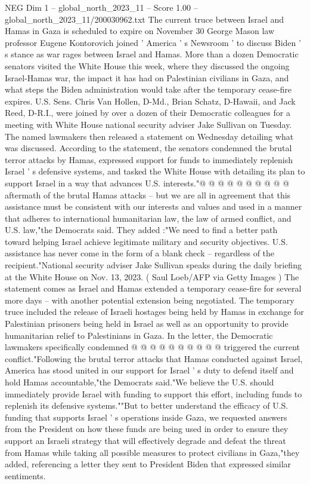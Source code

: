 \begin{textsample}{NEG Dim 1 – global\_north\_2023\_11 – Score 1.00 – global\_north\_2023\_11/200030962.txt}  \label{ex:f1_neg_098}
The current truce between Israel and Hamas in Gaza is scheduled to expire on November 30 George Mason law professor Eugene Kontorovich joined ' America ' s Newsroom ' to discuss Biden ' s stance as war rages between Israel and Hamas.
More than a dozen Democratic senators visited the White House this week, where they discussed the ongoing Israel-Hamas war, the impact it has had on Palestinian civilians in Gaza, and what steps the Biden administration would take after the temporary cease-fire expires.
U.S.
Sens.
Chris Van Hollen, D-Md., Brian Schatz, D-Hawaii, and Jack Reed, D-R.I., were joined by over a dozen of their Democratic colleagues for a meeting with White House national security adviser Jake Sullivan on Tuesday.
The named lawmakers then released a statement on Wednesday detailing what was discussed.
According to the statement, the senators condemned the brutal terror attacks by Hamas, expressed support for funds to immediately replenish Israel ' s defensive systems, and tasked the White House with detailing its plan to support Israel in a way that advances U.S. interests."@ @ @ @ @ @ @ @ @ @ aftermath of the brutal Hamas attacks -- but we are all in agreement that this assistance must be consistent with our interests and values and used in a manner that adheres to international humanitarian law, the law of armed conflict, and U.S. law,"the Democrats said.
They added :"We need to find a better path toward helping Israel achieve legitimate military and security objectives.
U.S. assistance has never come in the form of a blank check -- regardless of the recipient."National security adviser Jake Sullivan speaks during the daily briefing at the White House on Nov. 13, 2023. ( Saul Loeb/AFP via Getty Images ) The statement comes as Israel and Hamas extended a temporary cease-fire for several more days -- with another potential extension being negotiated.
The temporary truce included the release of Israeli hostages being held by Hamas in exchange for Palestinian prisoners being held in Israel as well as an opportunity to provide humanitarian relief to Palestinians in Gaza.
In the letter, the Democratic lawmakers specifically condemned @ @ @ @ @ @ @ @ @ @ triggered the current conflict."Following the brutal terror attacks that Hamas conducted against Israel, America has stood united in our support for Israel ' s duty to defend itself and hold Hamas accountable,"the Democrats said."We believe the U.S. should immediately provide Israel with funding to support this effort, including funds to replenish its defensive systems.""But to better understand the efficacy of U.S. funding that supports Israel ' s operations inside Gaza, we requested answers from the President on how these funds are being used in order to ensure they support an Israeli strategy that will effectively degrade and defeat the threat from Hamas while taking all possible measures to protect civilians in Gaza,"they added, referencing a letter they sent to President Biden that expressed similar sentiments.

\end{textsample}
